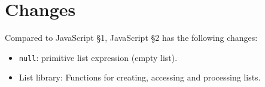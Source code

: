 





\section{Changes}

Compared to JavaScript \S 1, JavaScript \S 2 has the following changes:
\begin{itemize}
\item \lstinline{null}: primitive list expression (empty list).
\item List library: Functions for creating, accessing and processing lists.
\end{itemize}

\newpage































\newpage



    
